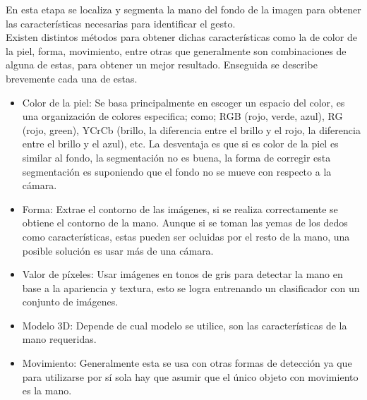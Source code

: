 En esta etapa se localiza y segmenta la mano del fondo de la imagen para obtener las características necesarias para identificar el gesto.\\
Existen distintos métodos para obtener dichas características como la de color de la piel, forma, movimiento, entre otras que generalmente son combinaciones de alguna de estas, para obtener un mejor resultado. Enseguida se describe brevemente cada una de estas.  
\begin{itemize}
\item Color de la piel: Se basa principalmente en escoger un espacio del color, es una organización de colores especifica; como; RGB (rojo, verde, azul), RG (rojo, green), YCrCb (brillo, la diferencia entre el brillo y el rojo, la diferencia entre el brillo y el azul), etc. La desventaja es que si es color de la piel es similar al fondo, la segmentación no es buena, la forma de corregir esta segmentación es suponiendo que el fondo no se mueve con respecto a la cámara.
\item Forma: Extrae el contorno de las imágenes, si se realiza correctamente se obtiene el contorno de la mano. Aunque si se toman las yemas de los dedos como características, estas pueden ser ocluidas por el resto de la mano, una posible solución es usar más de una cámara.  
\item Valor de p\'ixeles: Usar imágenes en tonos de gris para detectar la mano en base a la apariencia y textura, esto se logra entrenando un clasificador con un conjunto de imágenes.
\item Modelo 3D: Depende de cual modelo se utilice, son las características de la mano requeridas. 
\item Movimiento: Generalmente esta se usa con otras formas de detección ya que para utilizarse por sí sola hay que asumir que el único objeto con movimiento es la mano.
\end{itemize} 

